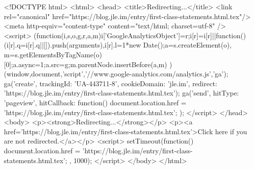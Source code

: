<!DOCTYPE html>
<html>
<head>
<title>Redirecting...</title>
<link rel="canonical" href="https://blog.jle.im/entry/first-class-statements.html.tex"/>
<meta http-equiv="content-type" content="text/html; charset=utf-8" />
<script>
(function(i,s,o,g,r,a,m){i['GoogleAnalyticsObject']=r;i[r]=i[r]||function(){
(i[r].q=i[r].q||[]).push(arguments)},i[r].l=1*new Date();a=s.createElement(o),
m=s.getElementsByTagName(o)[0];a.async=1;a.src=g;m.parentNode.insertBefore(a,m)
})(window,document,'script','//www.google-analytics.com/analytics.js','ga');
ga('create', { trackingId: 'UA-443711-8', cookieDomain: 'jle.im', redirect: 'https://blog.jle.im/entry/first-class-statements.html.tex'});
ga('send', { hitType: 'pageview', hitCallback: function() { document.location.href = 'https://blog.jle.im/entry/first-class-statements.html.tex'; } });
</script>
</head>
<body>
  <p><strong>Redirecting...</strong></p>
  <p><a href='https://blog.jle.im/entry/first-class-statements.html.tex'>Click here if you are not redirected.</a></p>
  <script>
    setTimeout(function() { document.location.href = 'https://blog.jle.im/entry/first-class-statements.html.tex'; }, 1000);
  </script>
</body>
</html>
